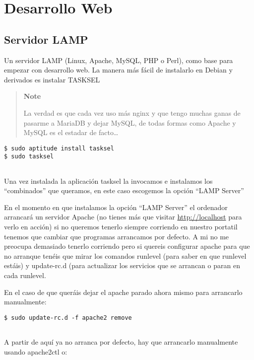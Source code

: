 \section{Desarrollo Web}\label{desarrollo-web}

\subsection{Servidor LAMP}\label{servidor-lamp}

Un servidor LAMP (Linux, Apache, MySQL, PHP o Perl), como base para
empezar con desarrollo web. La manera más fácil de instalarlo en Debian
y derivados es instalar TASKSEL

\begin{quote}
\textbf{Note}

La verdad es que cada vez uso más nginx y que tengo muchas ganas de
pasarme a MariaDB y dejar MySQL, de todas formas como Apache y MySQL es
el estadar de facto\ldots{}
\end{quote}

\begin{verbatim}
$ sudo aptitude install tasksel
$ sudo tasksel
      
\end{verbatim}

Una vez instalada la aplicación tasksel la invocamos e instalamos los
``combinados'' que queramos, en este caso escogemos la opción ``LAMP
Server''

En el momento en que instalamos la opción ``LAMP Server'' el ordenador
arrancará un servidor Apache (no tienes más que visitar
\url{http://localhost} para verlo en acción) si no queremos tenerlo
siempre corriendo en nuestro portatil tenemos que cambiar que programas
arrancamos por defecto. A mi no me preocupa demasiado tenerlo corriendo
pero si quereis configurar apache para que no arranque tenéis que mirar
los comandos runlevel (para saber en que runlevel estáis) y update-rc.d
(para actualizar los servicios que se arrancan o paran en cada runlevel.

En el caso de que queráis dejar el apache parado ahora mismo para
arrancarlo manualmente:

\begin{verbatim}
$ sudo update-rc.d -f apache2 remove
      
\end{verbatim}

A partir de aquí ya no arranca por defecto, hay que arrancarlo
manualmente usando apache2ctl o:


